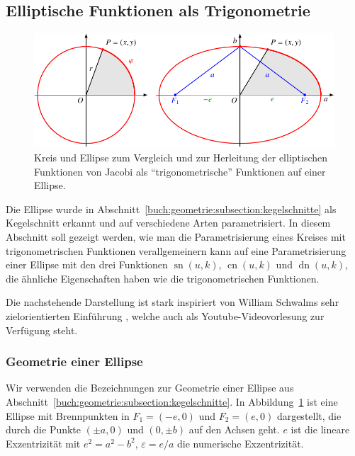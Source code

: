 %
%
%

%
%
\subsection{Elliptische Funktionen als Trigonometrie}
\begin{figure}
\centering
\includegraphics{chapters/110-elliptisch/images/ellipse.pdf}
\caption{Kreis und Ellipse zum Vergleich und zur Herleitung der 
elliptischen Funktionen von Jacobi als ``trigonometrische'' Funktionen
auf einer Ellipse.
\label{buch:elliptisch:fig:ellipse}}
\end{figure}
Die Ellipse wurde in Abschnitt~\ref{buch:geometrie:subsection:kegelschnitte}
als Kegelschnitt erkannt und auf verschiedene Arten parametrisiert.
In diesem Abschnitt soll gezeigt werden, wie man die Parametrisierung
eines Kreises mit trigonometrischen Funktionen verallgemeinern kann
auf eine Parametrisierung einer Ellipse mit den drei
Funktionen $\operatorname{sn}(u,k)$,
$\operatorname{cn}(u,k)$ und $\operatorname{dn}(u,k)$,
die ähnliche Eigenschaften haben wie die trigonometrischen Funktionen.

Die nachstehende Darstellung ist stark inspiriert von William Schwalms 
sehr zielorientierten Einführung
\cite{buch:schwalm}, welche auch als Youtube-Videovorlesung
\cite{buch:schwalm-youtube} zur Verfügung steht.

%
%
\subsubsection{Geometrie einer Ellipse}
Wir verwenden die Bezeichnungen zur Geometrie einer Ellipse aus
Abschnitt~\ref{buch:geometrie:subsection:kegelschnitte}.
In Abbildung~\ref{buch:elliptisch:fig:ellipse} ist eine Ellipse
mit Brennpunkten in $F_1=(-e,0)$ und $F_2=(e,0)$ dargestellt,
die durch die Punkte $(\pm a,0)$ und $(0,\pm b)$ auf den Achsen geht.
$e$ ist die lineare Exzentrizität mit $e^2=a^2-b^2$,
$\varepsilon=e/a$ die numerische Exzentrizität.

